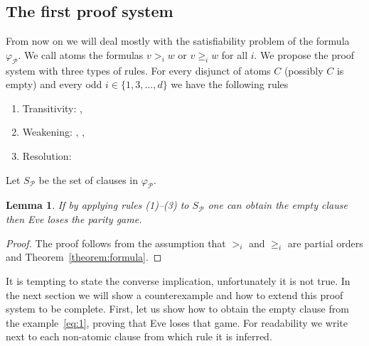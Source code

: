 \documentclass[a4paper,10pt]{article}
\newtheorem{lemma}{Lemma}
\begin{document}
\subsection{The first proof system}
From now on we will deal mostly with the satisfiability problem of the formula $\varphi_{\mathcal{P}}$. We call atoms the formulas $v >_i w$ or $v \ge_i w$ for all $i$.
We propose the proof system with three types of rules. For every disjunct of atoms $C$ (possibly $C$ is empty) and every odd $i \in \{1,3,\ldots,d\}$ we have the following rules
\begin{enumerate}
 \item Transitivity: ,\;\;

\item Weakening: ,\;\;
,\;\;

\item Resolution: 
\end{enumerate}
Let $S_{\mathcal{P}}$ be the set of clauses in $\varphi_{\mathcal{P}}$.
\begin{lemma}
\label{lemma:correctness}
If by applying rules (1)--(3) to $S_{\mathcal{P}}$ one can obtain the empty clause then Eve loses the parity game.
\end{lemma}
\begin{proof}
The proof follows from the assumption that $>_i$ and $\ge_i$ are partial orders and Theorem~\ref{theorem:formula}.
\end{proof}

It is tempting to state the converse implication, unfortunately it is not true. In the next section we will show a counterexample and how to extend this proof system to be complete. First, let us show how to obtain the empty clause from the example~\eqref{eq:1}, proving that Eve loses that game. For readability we write next to each non-atomic clause from which rule it is inferred.

\begin{prooftree}
\end{prooftree}
\end{document}
